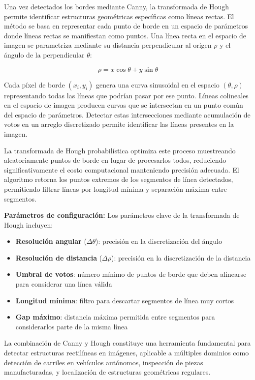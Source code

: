 Una vez detectados los bordes mediante Canny, la transformada de Hough permite identificar estructuras geométricas específicas como líneas rectas. El método se basa en representar cada punto de borde en un espacio de parámetros donde líneas rectas se manifiestan como puntos. Una línea recta en el espacio de imagen se parametriza mediante su distancia perpendicular al origen $\rho$ y el ángulo de la perpendicular $\theta$:

\begin{equation}
\rho = x \cos\theta + y \sin\theta
\end{equation}

Cada píxel de borde $(x_i, y_i)$ genera una curva sinusoidal en el espacio $(\theta, \rho)$ representando todas las líneas que podrían pasar por ese punto. Líneas colineales en el espacio de imagen producen curvas que se intersectan en un punto común del espacio de parámetros. Detectar estas intersecciones mediante acumulación de votos en un arreglo discretizado permite identificar las líneas presentes en la imagen.

La transformada de Hough probabilística optimiza este proceso muestreando aleatoriamente puntos de borde en lugar de procesarlos todos, reduciendo significativamente el costo computacional manteniendo precisión adecuada. El algoritmo retorna los puntos extremos de los segmentos de línea detectados, permitiendo filtrar líneas por longitud mínima y separación máxima entre segmentos.

\textbf{Parámetros de configuración:} Los parámetros clave de la transformada de Hough incluyen:
\begin{itemize}
\item \textbf{Resolución angular} ($\Delta\theta$): precisión en la discretización del ángulo
\item \textbf{Resolución de distancia} ($\Delta\rho$): precisión en la discretización de la distancia
\item \textbf{Umbral de votos}: número mínimo de puntos de borde que deben alinearse para considerar una línea válida
\item \textbf{Longitud mínima}: filtro para descartar segmentos de línea muy cortos
\item \textbf{Gap máximo}: distancia máxima permitida entre segmentos para considerarlos parte de la misma línea
\end{itemize}

La combinación de Canny y Hough constituye una herramienta fundamental para detectar estructuras rectilíneas en imágenes, aplicable a múltiples dominios como detección de carriles en vehículos autónomos, inspección de piezas manufacturadas, y localización de estructuras geométricas regulares.
